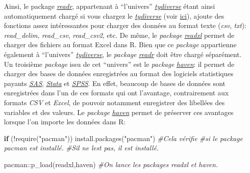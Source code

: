 \documentclass[
]{book}
\newenvironment{Shaded}{\begin{snugshade}}{\end{snugshade}}
\newcommand{\CommentTok}[1]{\textcolor[rgb]{0.56,0.35,0.01}{\textit{#1}}}
\newcommand{\ControlFlowTok}[1]{\textcolor[rgb]{0.13,0.29,0.53}{\textbf{#1}}}
\newcommand{\FunctionTok}[1]{\textcolor[rgb]{0.00,0.00,0.00}{#1}}
\newcommand{\NormalTok}[1]{#1}
\newcommand{\SpecialCharTok}[1]{\textcolor[rgb]{0.00,0.00,0.00}{#1}}
\newcommand{\StringTok}[1]{\textcolor[rgb]{0.31,0.60,0.02}{#1}}
\begin{document}
Ainsi, le package \href{https://readr.tidyverse.org/}{\emph{readr}}, appartenant à ``l'univers'' \href{https://www.tidyverse.org/}{\emph{tydiverse}} étant ainsi automatiquement chargé si vous chargez le \href{https://www.tidyverse.org/}{\emph{tydiverse}} (voir \protect\hyperlink{packages}{ici}), ajoute des fonctions assez intéressantes pour charger des données au format texte (\emph{csv}, \emph{txt}): \emph{read\_delim}, \emph{read\_csv}, \emph{read\_csv2}, etc. De même, le \emph{package} \href{https://readxl.tidyverse.org/}{\emph{readxl}} permet de charger des fichiers au format Excel dans R. Bien que ce \emph{package} appartienne également à ``l'univers'' \href{https://www.tidyverse.org/}{\emph{tydiverse}}, le \emph{package} \href{https://readr.tidyverse.org/}{\emph{readr}} doit être chargé séparément. Un troisième \emph{package} issu de cet ``univers'' est le \emph{package} \href{https://haven.tidyverse.org/}{\emph{haven}}: il permet de charger des bases de données enregistrées au format des logiciels statistiques payants \href{https://www.sas.com/}{\emph{SAS}}, \href{https://www.stata.com/}{\emph{Stata}} et \href{https://www.ibm.com/fr-fr/products/spss-statistics}{\emph{SPSS}}. En effet, beaucoup de bases de données sont enregistrées dans l'un de ces formats qui ont l'avantage, contrairement aux formats \emph{CSV} et \emph{Excel}, de pouvoir notamment enregistrer des libellées des variables et des valeurs. Le \emph{package} \href{https://haven.tidyverse.org/}{\emph{haven}} permet de préserver ces avantages lorsque l'on importe les données dans R:

\begin{Shaded}
\begin{Highlighting}[]
\ControlFlowTok{if}\NormalTok{ (}\SpecialCharTok{!}\FunctionTok{require}\NormalTok{(}\StringTok{"pacman"}\NormalTok{)) }\FunctionTok{install.packages}\NormalTok{(}\StringTok{"pacman"}\NormalTok{) }\CommentTok{\#Cela vérifie}
                             \CommentTok{\#si le package pacman est installé.}
                             \CommentTok{\#S\textquotesingle{}il ne l\textquotesingle{}est pas, il est installé.}

\NormalTok{pacman}\SpecialCharTok{::}\FunctionTok{p\_load}\NormalTok{(readxl,haven) }\CommentTok{\#On lance les packages readxl et haven.}
\end{Highlighting}
\end{Shaded}
\end{document}
